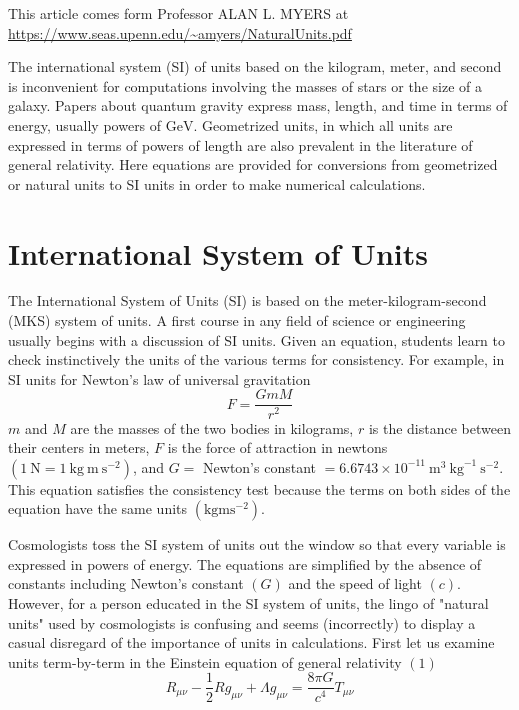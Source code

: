 \documentclass[main.tex]{subfiles}
\begin{document}
This article comes form Professor ALAN L. MYERS at \url{https://www.seas.upenn.edu/~amyers/NaturalUnits.pdf}


\begin{Abstract}
\begin{changemargin}{1cm}{1cm}
The international system (SI) of units based on the kilogram, meter, and second is inconvenient for computations involving the masses of stars or the size of a galaxy. Papers about quantum gravity express mass, length, and time in terms of energy, usually powers of $\mathrm{GeV}$. Geometrized units, in which all units are expressed in terms of powers of length are also prevalent in the literature of general relativity. Here equations are provided for conversions from geometrized or natural units to SI units in order to make numerical calculations.
\end{changemargin}
\end{Abstract}

\section{International System of Units}
The International System of Units (SI) is based on the meter-kilogram-second (MKS) system of units. A first course in any field of science or engineering usually begins with a discussion of SI units. Given an equation, students learn to check instinctively the units of the various terms for consistency. For example, in SI units for Newton's law of universal gravitation
$$
F=\frac{G m M}{r^2}
$$
$m$ and $M$ are the masses of the two bodies in kilograms, $r$ is the distance between their centers in meters, $F$ is the force of attraction in newtons $\left(1 \mathrm{~N}=1 \mathrm{~kg} \mathrm{~m} \mathrm{~s}^{-2}\right)$, and $G=$ Newton's constant $=6.6743 \times 10^{-11} \mathrm{~m}^3 \mathrm{~kg}^{-1} \mathrm{~s}^{-2}$. This equation satisfies the consistency test because the terms on both sides of the equation have the same units $\left(\mathrm{kg} \mathrm{m} \mathrm{s}^{-2}\right)$.

Cosmologists toss the SI system of units out the window so that every variable is expressed in powers of energy. The equations are simplified by the absence of constants including Newton's constant $(G)$ and the speed of light $(c)$. However, for a person educated in the SI system of units, the lingo of "natural units" used by cosmologists is confusing and seems (incorrectly) to display a casual disregard of the importance of units in calculations.
First let us examine units term-by-term in the Einstein equation of general relativity
$(1)$
$$
R_{\mu \nu}-\frac{1}{2} R g_{\mu \nu}+\Lambda g_{\mu \nu}=\frac{8 \pi G}{c^4} T_{\mu \nu}
$$
\end{document}
